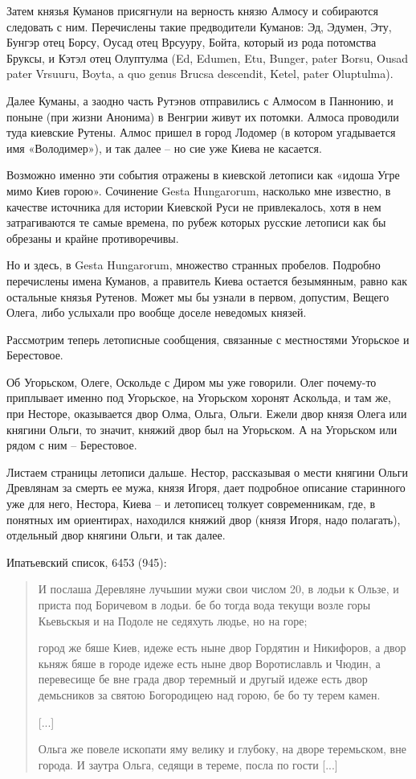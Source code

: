 Затем князья Куманов присягнули на верность князю Алмосу и собираются следовать с ним. Перечислены такие предводители Куманов: Эд, Эдумен, Эту, Бунгэр отец Борсу, Оусад отец Врсууру, Бойта, который из рода потомства Бруксы, и Кэтэл отец Олуптулма (Ed, Edumen, Etu, Bunger, pater Borsu, Ousad pater Vrsuuru, Boyta, a quo genus Brucsa descendit, Ketel, pater Oluptulma).

Далее Куманы, а заодно часть Рутэнов отправились с Алмосом в Паннонию, и поныне (при жизни Анонима) в Венгрии живут их потомки. Алмоса проводили туда киевские Рутены. Алмос пришел в город Лодомер (в котором угадывается имя «Володимер»), и так 
далее – но сие уже Киева не касается. 

Возможно именно эти события отражены в киевской летописи как «идоша Угре мимо Киев горою». Сочинение Gesta Hungarorum, насколько мне известно, в качестве источника для истории Киевской Руси не привлекалось, хотя в нем затрагиваются те самые времена, по рубеж которых русские летописи как бы обрезаны и крайне противоречивы.

Но и здесь, в Gesta Hungarorum, множество странных пробелов. Подробно перечислены имена Куманов, а правитель Киева остается безымянным, равно как остальные князья Рутенов. Может мы бы узнали в первом, допустим, Вещего Олега, либо услыхали про вообще доселе неведомых князей.

Рассмотрим теперь летописные сообщения, связанные с местностями Угорьское и Берестовое.

Об Угорьском, Олеге, Оскольде с Диром мы уже говорили. Олег почему-то приплывает именно под Угорьское, на Угорьском хоронят Аскольда, и там же, при Несторе, оказывается двор Олма, Ольга, Ольги. Ежели двор князя Олега или княгини Ольги, то значит, княжий двор был на Угорьском. А на Угорьском или рядом с ним – Берестовое.

Листаем страницы летописи дальше. Нестор, рассказывая о мести княгини Ольги Древлянам за смерть ее мужа, князя Игоря, дает подробное описание старинного уже для него, Нестора, Киева – и летописец толкует современникам, где, в понятных им ориентирах, находился княжий двор (князя Игоря, надо полагать), отдельный двор княгини Ольги, и так далее.

Ипатьевский список, 6453 (945):

\begin{quotation}
И послаша Деревляне лучьшии мужи свои числом 20, в лодьи к Ользе, и приста под Боричевом в лодьи. бе бо тогда вода текущи возле горы Кьевьскыя и на Подоле не седяхуть людье, но на горе;

город же бяше Киев, идеже есть ныне двор Гордятин и Никифоров, а двор кьняж бяше в городе идеже есть ныне двор Воротиславль и Чюдин, а перевесище бе вне града двор теремный и другый идеже есть двор демьсников за святою Богородицею над горою, бе бо ту терем камен.

[...]

Ольга же повеле ископати яму велику и глубоку, на дворе теремьском, вне города. И заутра Ольга, седящи в тереме, посла по гости [...]
\end{quotation}

